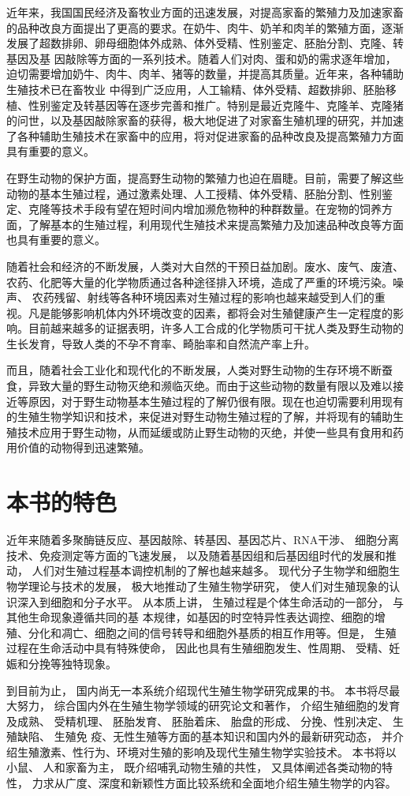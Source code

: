近年来，我国国民经济及畜牧业方面的迅速发展，对提高家畜的繁殖力及加速家畜的品种改良方面提出了更高的要求。在奶牛、肉牛、奶羊和肉羊的繁殖方面，逐渐发展了超数排卵、卵母细胞体外成熟、体外受精、性别鉴定、胚胎分割、克隆、转基因及基 因敲除等方面的一系列技术。随着人们对肉、蛋和奶的需求逐年增加，迫切需要增加奶牛、肉牛、肉羊、猪等的数量，并提高其质量。近年来，各种辅助生殖技术已在畜牧业 中得到广泛应用，人工输精、体外受精、超数排卵、胚胎移植、性别鉴定及转基因等在逐步完善和推广。特别是最近克隆牛、克隆羊、克隆猪的问世，以及基因敲除家畜的获得，极大地促进了对家畜生殖机理的研究，并加速了各种辅助生殖技术在家畜中的应用，将对促进家畜的品种改良及提高繁殖力方面具有重要的意义。

在野生动物的保护方面，提高野生动物的繁殖力也迫在眉睫。目前，需要了解这些动物的基本生殖过程，通过激素处理、人工授精、体外受精、胚胎分割、性别鉴定、克隆等技术手段有望在短时间内增加濒危物种的种群数量。在宠物的饲养方面，了解基本的生殖过程，利用现代生殖技术来提高繁殖力及加速品种改良等方面也具有重要的意义。

随着社会和经济的不断发展，人类对大自然的干预日益加剧。废水、废气、废渣、 农药、化肥等大量的化学物质通过各种途径排入环境，造成了严重的环境污染。噪声、 农药残留、射线等各种环境因素对生殖过程的影响也越来越受到人们的重视。凡是能够影响机体内外环境改变的因素，都将会对生殖健康产生一定程度的影响。目前越来越多的证据表明，许多人工合成的化学物质可干扰人类及野生动物的生长发育，导致人类的不孕不育率、畸胎率和自然流产率上升。

而且，随着社会工业化和现代化的不断发展，人类对野生动物的生存环境不断蚕食，异致大量的野生动物灭绝和濒临灭绝。而由于这些动物的数量有限以及难以接近等原因，对于野生动物基本生殖过程的了解仍很有限。现在也迫切需要利用现有的生殖生物学知识和技术，来促进对野生动物生殖过程的了解，并将现有的辅助生殖技术应用于野生动物，从而延缓或防止野生动物的灭绝，并使一些具有食用和药用价值的动物得到迅速繁殖。

\section{本书的特色}

近年来随着多聚酶链反应、基因敲除、转基因、基因芯片、RNA干涉、 细胞分离技术、免疫测定等方面的飞速发展， 以及随着基因组和后基因组时代的发展和推动， 人们对生殖过程基本调控机制的了解也越来越多。 现代分子生物学和细胞生物学理论与技术的发展， 极大地推动了生殖生物学研究， 使人们对生殖现象的认识深入到细胞和分子水平。 从本质上讲， 生殖过程是个体生命活动的一部分， 与其他生命现象遵循共同的基 本规律，如基因的时空特异性表达调控、细胞的增殖、分化和凋亡、细胞之间的信号转导和细胞外基质的相互作用等。但是， 生殖过程在生命活动中具有特殊使命， 因此也具有生殖细胞发生、性周期、 受精、妊娠和分挽等独特现象。

到目前为止， 国内尚无一本系统介绍现代生殖生物学研究成果的书。 本书将尽最大努力， 综合国内外在生殖生物学领域的研究论文和著作， 介绍生殖细胞的发育及成熟、 受精机理、 胚胎发育、 胚胎着床、 胎盘的形成、 分挽、性别决定、 生殖缺陷、 生殖免 疫、无性生殖等方面的基本知识和国内外的最新研究动态， 并介绍生殖激素、性行为、环境对生殖的影响及现代生殖生物学实验技术。 本书将以小鼠、 人和家畜为主， 既介绍哺乳动物生殖的共性， 又具体阐述各类动物的特性， 力求从广度、深度和新颖性方面比较系统和全面地介绍生殖生物学的内容。


